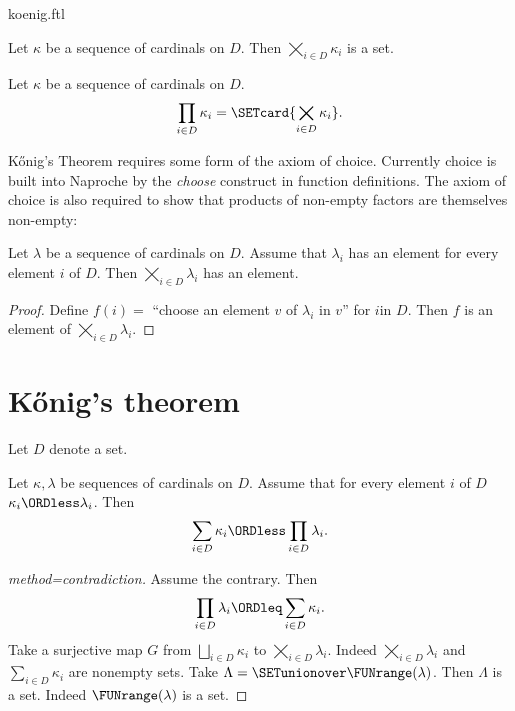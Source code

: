 \documentclass{article}
\newcommand{\SumSet}[2]{\bigsqcup_{i \in #2} #1_{i}}
\newcommand{\Sum}[2]{\sum_{i \in #2} #1_{i}}
\newcommand{\ProdSet}[2]{\bigtimes_{i \in #2} #1_{i}}
\newcommand{\Prod}[2]{\prod_{i \in #2} #1_{i}}
\begin{document}
\begin{smodule}{koenig.ftl}
\begin{forthel}
  \begin{axiom*}
    Let $\kappa$ be a sequence of cardinals on $D$.
    Then $\ProdSet{\kappa}{D}$ is a set.
  \end{axiom*}

  \begin{definition*}
    Let $\kappa$ be a sequence of cardinals on $D$.
    \[ \Prod{\kappa}{D} = \SETcard{ \ProdSet{\kappa}{D} }. \]
  \end{definition*}
\end{forthel}

Kőnig's Theorem requires some form of the axiom of choice.
Currently choice is built into Naproche by the \emph{choose} construct in
function definitions.
The axiom of choice is also required to show that products of non-empty factors
are themselves non-empty:

\begin{forthel}
  \begin{lemma*}[title=Choice]
    Let $\lambda$ be a sequence of cardinals on $D$.
    Assume that $\lambda_{i}$ has an element for every element $i$ of $D$.
    Then $\ProdSet{\lambda}{D}$ has an element.
  \end{lemma*}
  \begin{proof}
    Define $f(i) =$ ``choose an element $v$ of $\lambda_{i}$ in $v$'' for $i$in $D$.
    Then $f$ is an element of $\ProdSet{\lambda}{D}$.
  \end{proof}
\end{forthel}


\section*{Kőnig's theorem}

\begin{forthel}
  Let $D$ denote a set.

  \begin{theorem*}[title=Kőnig,id=koenig]
    Let $\kappa, \lambda$ be sequences of cardinals on $D$.
    Assume that for every element $i$ of $D$ $\kappa_{i} \ORDless \lambda_{i}$.
    Then \[ \Sum{\kappa}{D} \ORDless \Prod{\lambda}{D}. \]
  \end{theorem*}
  \begin{proof}[method=contradiction]
    Assume the contrary.
    Then \[ \Prod{\lambda}{D} \ORDleq \Sum{\kappa}{D}. \]
    Take a surjective map $G$ from $\SumSet{\kappa}{D}$ to $\ProdSet{\lambda}{D}$.
    Indeed $\ProdSet{\lambda}{D}$ and $\Sum{\kappa}{D}$ are nonempty sets.
    Take $\Lambda = \SETunionover \FUNrange(\lambda)$.
    Then $\Lambda$ is a set.
    Indeed $\FUNrange(\lambda)$ is a set.


\end{proof}
\end{forthel}
\end{smodule}
\end{document}
